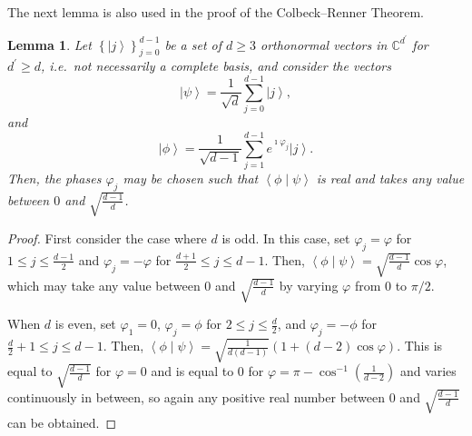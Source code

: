 \documentclass[DIV=calc,paper=a4,fontsize=11pt,twocolumn]{scrartcl} %
\theoremstyle{definition}
\theoremstyle{plain}
\newtheorem{lemma}[definition]{Lemma}
\newcommand{\Ket}[1]{\ensuremath{\left \vert #1 \right \rangle}}
\newcommand{\BraKet}[2]{\ensuremath{\left \langle #1 \middle \vert #2
\right \rangle}}
\begin{document}
The next lemma is also used in the proof of the Colbeck--Renner
Theorem.
\begin{lemma}
\label{lem:Hardy:inner}
Let $\left \{ \Ket{j} \right \}_{j=0}^{d-1}$ be a set of $d \geq 3$
orthonormal vectors in $\mathbb{C}^{d^{\prime}}$ for $d^{\prime}
\geq d$, i.e.\ not necessarily a complete basis, and consider the
vectors
\begin{equation}
\Ket{\psi} = \frac{1}{\sqrt{d}} \sum_{j=0}^{d-1} \Ket{j},
\end{equation}
and
\begin{equation}
\Ket{\phi} = \frac{1}{\sqrt{d-1}} \sum_{j=1}^{d-1} e^{\imath
\varphi_j} \Ket{j}.
\end{equation}
Then, the phases $\varphi_j$ may be chosen such that
$\BraKet{\phi}{\psi}$ is real and takes any value between $0$ and
$\sqrt{\frac{d-1}{d}}$.
\end{lemma}
\begin{proof}
First consider the case where $d$ is odd.  In this case, set
$\varphi_j = \varphi$ for $1 \leq j \leq \frac{d-1}{2}$ and
$\varphi_j = -\varphi$ for $\frac{d+1}{2} \leq j \leq {d-1}$.  Then,
$\BraKet{\phi}{\psi} = \sqrt{\frac{d-1}{d}} \cos \varphi$, which may
take any value between $0$ and $\sqrt{\frac{d-1}{d}}$ by varying
$\varphi$ from $0$ to $\pi/2$.

When $d$ is even, set $\varphi_1 = 0$, $\varphi_j = \phi$ for $2
\leq j \leq \frac{d}{2}$, and $\varphi_j = -\phi$ for $\frac{d}{2} +
1 \leq j \leq {d-1}$. Then, $\BraKet{\phi}{\psi} =
\sqrt{\frac{1}{d(d-1)}} (1 + (d-2)\cos \varphi)$.  This is equal to
$\sqrt{\frac{d-1}{d}}$ for $\varphi = 0$ and is equal to $0$ for
$\varphi = \pi - \cos^{-1} \left ( \frac{1}{d-2} \right )$ and
varies continuously in between, so again any positive real number
between $0$ and $\sqrt{\frac{d-1}{d}}$ can be obtained.
\end{proof}
\end{document}
